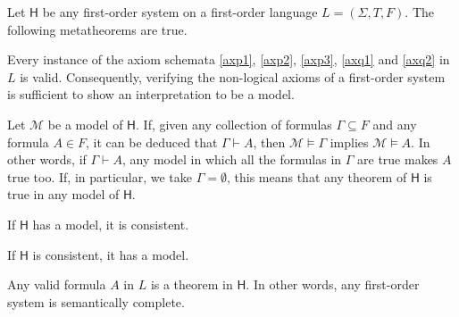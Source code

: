 \begin{theorem}
\label{proph}
Let $\mathsf{H}$ be any first-order system on a first-order language $L = (\Sigma,T,F)$. The following metatheorems are true.
\begin{statements}
\item \label{haxtrue} Every instance of the axiom schemata \ref{axp1}, \ref{axp2}, \ref{axp3}, \ref{axq1} and \ref{axq2} in $L$ is valid. Consequently, verifying the non-logical axioms of a first-order system is sufficient to show an interpretation to be a model.
\item \label{hsound} Let $\mathcal{M}$ be a model of $\mathsf{H}$. If, given any collection of formulas $\Gamma\subseteq F$ and any formula $A\in F$, it can be deduced that $\Gamma\vdash A$, then $\mathcal{M}\vDash \Gamma$ implies $\mathcal{M}\vDash A$. In other words, if $\Gamma\vdash A$, any model in which all the formulas in $\Gamma$ are true makes $A$ true too. If, in particular, we take $\Gamma = \emptyset$, this means that any theorem of $\mathsf{H}$ is true in any model of $\mathsf{H}$.
\item \label{hcons} If $\mathsf{H}$ has a model, it is consistent.
\item \label{consmodel} If $\mathsf{H}$ is consistent, it has a model.
\item \label{hsemc} Any valid formula $A$ in $L$ is a theorem in $\mathsf{H}$. In other words, any first-order system is semantically complete.
\end{statements}
\label{<+label+>}
\end{theorem}

